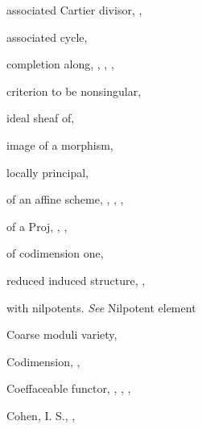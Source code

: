 {{\noindent\hspace*{7.5bp}associated Cartier divisor, , \par
\noindent\hspace*{7.5bp}associated cycle, \par
\noindent\hspace*{7.5bp}completion along, , , , \par
\noindent\hspace*{7.5bp}criterion to be nonsingular, \par
\noindent\hspace*{7.5bp}ideal sheaf of, \par
\noindent\hspace*{7.5bp}image of a morphism, \par
\noindent\hspace*{7.5bp}locally principal, \par
\noindent\hspace*{7.5bp}of an affine scheme, , , , \par
\noindent\hspace*{7.5bp}of a Proj, , , \par
\noindent\hspace*{7.5bp}of codimension one, \par
\noindent\hspace*{7.5bp}reduced induced structure, , \par
\noindent\hspace*{7.5bp}with nilpotents. \emph{See} Nilpotent element\par
\noindent\hspace*{0.0bp}Coarse moduli variety, \par
\noindent\hspace*{0.0bp}Codimension, , \par
\noindent\hspace*{0.0bp}Coeffaceable functor, , , , \par
\noindent\hspace*{0.0bp}Cohen, I. S., , \par
}}
